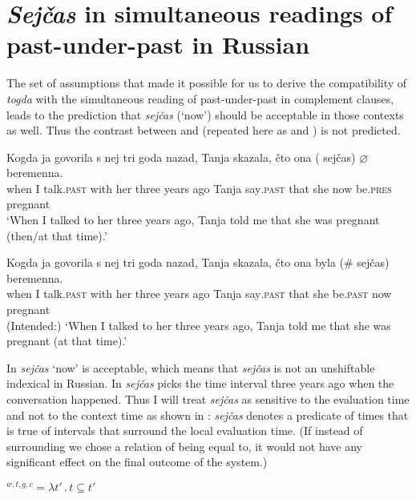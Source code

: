 \documentclass[output=paper,modfonts,newtxmath,hidelinks]{langscibook}
\begin{document}
\section{\textit{Sejčas} in simultaneous readings of past-under-past in Russian}\label{20:s3}

The set of assumptions that made it possible for us to derive the compatibility of \textit{togda} with the simultaneous reading of past-under-past in complement clauses, leads to the prediction that \textit{sejčas} (‘now’) should be acceptable in those contexts as well. Thus the contrast between  and  (repeated here as  and ) is not predicted.

\ea \label{20:ex43}
\gll Kogda ja govorila s nej tri goda nazad, Tanja skazala, čto ona\hspace{5pt} (\hspace{-2pt} sejčas) ${\varnothing}$ beremenna.\\
     when I talk\textsc{.past} with her three years ago Tanja say\textsc{.past} that she {} now be.\textsc{pres} pregnant\\
\glt `When I talked to her three years ago, Tanja told me that she was pregnant (then/at that time).'
\z

\ea \label{20:ex44}
\gll Kogda ja govorila s nej tri goda nazad, Tanja skazala, čto ona byla (\#\hspace{-2pt} sejčas) beremenna.\\
     when I talk\textsc{.past} with her three years ago Tanja say\textsc{.past} that she be.\textsc{past} {} now pregnant\\
\glt (Intended:) `When I talked to her three years ago, Tanja told me that she was pregnant (at that time).'
\z

\noindent In  \textit{sejčas} ‘now’ is acceptable, which means that \textit{sejčas} is not an unshiftable indexical in Russian. In  \textit{sejčas} picks the time interval three years ago when the conversation happened. Thus I will treat \textit{sejčas} as sensitive to the evaluation time and not to the context time as shown in : \textit{sejčas} denotes a predicate of times that is true of intervals that surround the local evaluation time. (If instead of surrounding we chose a relation of being equal to, it would not have any significant effect on the final outcome of the system.)

\ea {}$^{w,t,g,c}=\lambda t'\,.\,t\subseteq t'$\label{20:ex45}
\z
\end{document}
